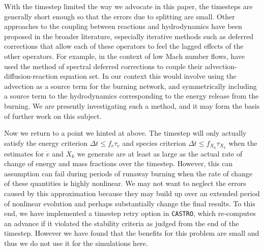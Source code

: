 \documentclass[twocolumn,numberedappendix]{../aastex6}
\newcommand{\castro}{\texttt{CASTRO}}
\begin{document}
With the timestep limited the way we advocate in this paper, 
the timesteps are generally short enough so that the errors 
due to splitting are small. Other approaches to the coupling 
between reactions and hydrodynamics have been proposed in the 
broader literature, especially iterative methods such as 
deferred corrections that allow each of these operators to 
feel the lagged effects of the other operators. For example,
in the context of low Mach number flows, \cite{nonaka:2012} have
used the method of spectral deferred corrections \citep{SDC} to
couple their advection-diffusion-reaction equation set. In our
context this would involve using the advection as a source term
for the burning network, and symmetrically including a source
term to the hydrodynamics corresponding to the energy release
from the burning. We are presently investigating such a method,
and it may form the basis of further work on this subject.

Now we return to a point we hinted at above. The timestep
will only actually satisfy the energy criterion
$\Delta t \leq f_e \tau_e$ and species criterion
$\Delta t \leq f_{X_k} \tau_{X_k}$ when the estimates for
$\dot{e}$ and $\dot{X_k}$ we generate are at least as large
as the actual rate of change of energy and mass fractions
over the timestep. However, this can assumption can fail
during periods of runaway burning when the rate of change
of these quantities is highly nonlinear. We may not want
to neglect the errors caused by this approximation
because they may build up over an extended period of nonlinear
evolution and perhaps substantially change the final results.
To this end, we have implemented a timestep retry option in
\castro, which re-computes an advance if it violated the
stability criteria as judged from the end of the timestep.
However we have found that the benefits for this problem are
small and thus we do not use it for the simulations here.
\end{document}
